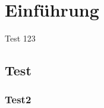 \newcommand{\package}{\emph}

\chapter{Einführung}
\label{chap:introduction}
Test 123

\section{Test}
\subsection{Test2}